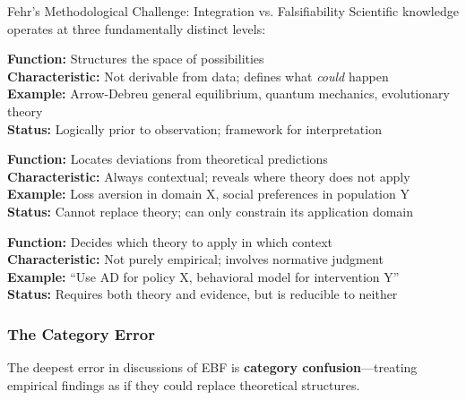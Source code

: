 \begin{chapter}{Fehr's Methodological Challenge: Integration vs. Falsifiability}
Scientific knowledge operates at three fundamentally distinct levels:

\begin{tcolorbox}[colback=blue!10!white,colframe=blue!75!black,title=\textbf{Level 1: Theory (Trans-Empirical)}]
\textbf{Function:} Structures the space of possibilities\\
\textbf{Characteristic:} Not derivable from data; defines what \textit{could} happen\\
\textbf{Example:} Arrow-Debreu general equilibrium, quantum mechanics, evolutionary theory\\
\textbf{Status:} Logically prior to observation; framework for interpretation
\end{tcolorbox}

\begin{tcolorbox}[colback=green!10!white,colframe=green!75!black,title=\textbf{Level 2: Empirical Evidence (Context-Bound)}]
\textbf{Function:} Locates deviations from theoretical predictions\\
\textbf{Characteristic:} Always contextual; reveals where theory does not apply\\
\textbf{Example:} Loss aversion in domain X, social preferences in population Y\\
\textbf{Status:} Cannot replace theory; can only constrain its application domain
\end{tcolorbox}

\begin{tcolorbox}[colback=yellow!10!white,colframe=yellow!75!black,title=\textbf{Level 3: Model Choice (Methodological-Normative)}]
\textbf{Function:} Decides which theory to apply in which context\\
\textbf{Characteristic:} Not purely empirical; involves normative judgment\\
\textbf{Example:} ``Use AD for policy X, behavioral model for intervention Y''\\
\textbf{Status:} Requires both theory and evidence, but is reducible to neither
\end{tcolorbox}

\subsubsection{The Category Error}

The deepest error in discussions of EBF is \textbf{category confusion}---treating empirical findings as if they could replace theoretical structures.


\end{chapter}
